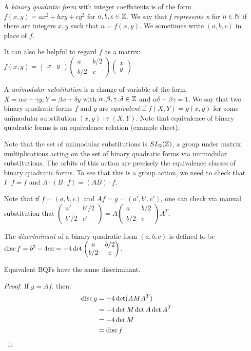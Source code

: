 \documentclass[10pt,a4paper]{article}
\begin{document}
A \emph{binary quadratic form} with integer coefficients is of the form $f(x,y) = ax^2 + bxy + cy^2$ for $a,b,c \in \mathbb{Z}$. We say that \emph{f represents n} for $n \in \mathbb{N}$ if there are integers $x,y$ such that $n = f(x,y)$. We sometimes write $(a,b,c)$ in place of $f$.

It can also be helpful to regard $f$ as a matrix:
$f(x,y) = \begin{pmatrix}
x & y
\end{pmatrix} \begin{pmatrix}
a & b/2 \\ b/2 & c
\end{pmatrix} \begin{pmatrix}
x \\ y
\end{pmatrix}$

A \emph{unimodular substitution} is a change of variable of the form $X = \alpha x + \gamma y; Y = \beta x + \delta y$ with $\alpha, \beta, \gamma, \delta \in \mathbb{Z}$ and $\alpha\delta-\beta\gamma=1$. We say that two binary quadratic forms $f$ and $g$ are \emph{equivalent} if $f(X,Y) = g(x,y)$ for some unimodular substitution $(x,y) \mapsto (X,Y)$. Note that equivalence of binary quadratic forms is an equivalence relation (example sheet).

Note that the set of unimodular substitutions is $SL_2(\mathbb{Z})$, a group under matrix multiplications acting on the set of binary quadratic forms via unimodular substitutions. The orbits of this action are precisely the equivalence classes of binary quadratic forms. To see that this is a group action, we need to check that $I \cdot f = f$ and $A\cdot (B\cdot f) = (AB)\cdot f$.

Note that if $f = (a,b,c)$ and $Af = g = (a',b',c')$, one can check via manual substitution that $\begin{pmatrix}
a' & b'/2 \\ b'/2 & c' \end{pmatrix} = A \begin{pmatrix}
a & b/2 \\ b/2 & c
\end{pmatrix}
A^T$.

The \emph{discriminant} of a binary quadratic form $(a,b,c)$ is defined to be $\operatorname{disc} f = b^2-4ac = -4 \det \begin{pmatrix}a & b/2 \\ b/2 & c\end{pmatrix}$.

\begin{lemma}
Equivalent BQFs have the same discriminant.
\end{lemma}
\begin{proof}
If $g=Af$, then:
\begin{align*}
\operatorname{disc} g &= -4 \det (A M A^T) \\
&= -4 \det M \det A \det A^T \\
&= -4 \det M \\
&= \operatorname{disc} f
\end{align*}
\end{proof}
\end{document}
